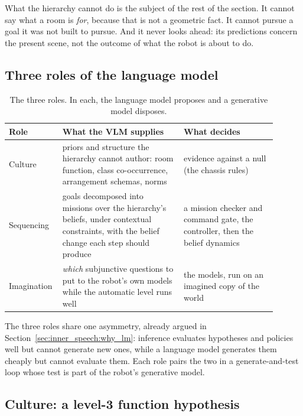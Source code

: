 What the hierarchy cannot do is the subject of the rest of the section. It cannot say what a room is \emph{for},
because that is not a geometric fact. It cannot pursue a goal it was not built to pursue. And it never looks ahead:
its predictions concern the present scene, not the outcome of what the robot is about to do.

\subsection{Three roles of the language model}
\label{sec:lang_hierarchy:roles}

\begin{table}[ht]
    \centering
    \small
    \begin{tabular}{|>{\raggedright\arraybackslash}p{0.14\linewidth}|>{\raggedright\arraybackslash}p{0.43\linewidth}|>{\raggedright\arraybackslash}p{0.33\linewidth}|}
        \hline
        \textbf{Role} & \textbf{What the VLM supplies} & \textbf{What decides} \\ \hline
        Culture     & priors and structure the hierarchy cannot author: room function, class co-occurrence, arrangement schemas, norms & evidence against a null (the chassis rules) \\ \hline
        Sequencing  & goals decomposed into missions over the hierarchy's beliefs, under contextual constraints, with the belief change each step should produce & a mission checker and command gate, the controller, then the belief dynamics \\ \hline
        Imagination & \emph{which} subjunctive questions to put to the robot's own models while the automatic level runs well & the models, run on an imagined copy of the world \\ \hline
    \end{tabular}
    \caption{The three roles. In each, the language model proposes and a generative model disposes.}
    \label{tab:lh_roles}
\end{table}

The three roles share one asymmetry, already argued in Section~\ref{sec:inner_speech:why_lm}: inference evaluates
hypotheses and policies well but cannot generate new ones, while a language model generates them cheaply but cannot
evaluate them. Each role pairs the two in a generate-and-test loop whose test is part of the robot's generative model.

\subsection{Culture: a level-3 function hypothesis}
\label{sec:lang_hierarchy:culture}

